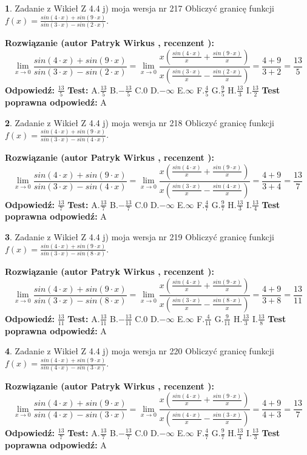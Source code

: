 \documentclass[12pt, a4paper]{article}
\theoremstyle{definition} %
\newtheorem{zad}{}
\newcommand{\zadStart}[1]{\begin{zad}#1\newline}
\newcommand{\zadStop}{\end{zad}}
\newcommand{\rozwStart}[2]{\noindent \textbf{Rozwiązanie (autor #1 , recenzent #2): }\newline}
\newcommand{\rozwStop}{\newline}
\newcommand{\odpStart}{\noindent \textbf{Odpowiedź:}\newline}
\newcommand{\odpStop}{\newline}
\newcommand{\testStart}{\noindent \textbf{Test:}\newline}
\newcommand{\testStop}{\newline}
\newcommand{\kluczStart}{\noindent \textbf{Test poprawna odpowiedź:}\newline}
\newcommand{\kluczStop}{\newline}
\begin{document}
\zadStart{Zadanie z Wikieł Z 4.4 j) moja wersja nr 217}
Obliczyć granicę funkcji $f(x)=\frac{sin(4\cdot x) +sin(9\cdot x)}{sin(3\cdot x) -sin(2\cdot x)}$.
\zadStop
\rozwStart{Patryk Wirkus}{}
$$\lim\limits_{x\to 0}\frac{sin(4\cdot x) +sin(9\cdot x)}{sin(3\cdot x) -sin(2\cdot x)}=\lim\limits_{x\to 0}\frac{x(\frac{sin(4\cdot x)}{x}+\frac{sin(9\cdot x)}{x})}{x(\frac{sin(3\cdot x)}{x}-\frac{sin(2\cdot x)}{x})}=\frac{4+9}{3+2} = \frac{13}{5}$$
\rozwStop
\odpStart
$\frac{13}{5}$
\odpStop
\testStart
A.$\frac{13}{5}$
B.$-\frac{13}{5}$
C.$0$
D.$-\infty$
E.$\infty$
F.$\frac{4}{5}$
G.$\frac{9}{5}$
H.$\frac{13}{3}$
I.$\frac{13}{2}$
\testStop
\kluczStart
A
\kluczStop



\zadStart{Zadanie z Wikieł Z 4.4 j) moja wersja nr 218}
Obliczyć granicę funkcji $f(x)=\frac{sin(4\cdot x) +sin(9\cdot x)}{sin(3\cdot x) -sin(4\cdot x)}$.
\zadStop
\rozwStart{Patryk Wirkus}{}
$$\lim\limits_{x\to 0}\frac{sin(4\cdot x) +sin(9\cdot x)}{sin(3\cdot x) -sin(4\cdot x)}=\lim\limits_{x\to 0}\frac{x(\frac{sin(4\cdot x)}{x}+\frac{sin(9\cdot x)}{x})}{x(\frac{sin(3\cdot x)}{x}-\frac{sin(4\cdot x)}{x})}=\frac{4+9}{3+4} = \frac{13}{7}$$
\rozwStop
\odpStart
$\frac{13}{7}$
\odpStop
\testStart
A.$\frac{13}{7}$
B.$-\frac{13}{7}$
C.$0$
D.$-\infty$
E.$\infty$
F.$\frac{4}{7}$
G.$\frac{9}{7}$
H.$\frac{13}{3}$
I.$\frac{13}{4}$
\testStop
\kluczStart
A
\kluczStop



\zadStart{Zadanie z Wikieł Z 4.4 j) moja wersja nr 219}
Obliczyć granicę funkcji $f(x)=\frac{sin(4\cdot x) +sin(9\cdot x)}{sin(3\cdot x) -sin(8\cdot x)}$.
\zadStop
\rozwStart{Patryk Wirkus}{}
$$\lim\limits_{x\to 0}\frac{sin(4\cdot x) +sin(9\cdot x)}{sin(3\cdot x) -sin(8\cdot x)}=\lim\limits_{x\to 0}\frac{x(\frac{sin(4\cdot x)}{x}+\frac{sin(9\cdot x)}{x})}{x(\frac{sin(3\cdot x)}{x}-\frac{sin(8\cdot x)}{x})}=\frac{4+9}{3+8} = \frac{13}{11}$$
\rozwStop
\odpStart
$\frac{13}{11}$
\odpStop
\testStart
A.$\frac{13}{11}$
B.$-\frac{13}{11}$
C.$0$
D.$-\infty$
E.$\infty$
F.$\frac{4}{11}$
G.$\frac{9}{11}$
H.$\frac{13}{3}$
I.$\frac{13}{8}$
\testStop
\kluczStart
A
\kluczStop



\zadStart{Zadanie z Wikieł Z 4.4 j) moja wersja nr 220}
Obliczyć granicę funkcji $f(x)=\frac{sin(4\cdot x) +sin(9\cdot x)}{sin(4\cdot x) -sin(3\cdot x)}$.
\zadStop
\rozwStart{Patryk Wirkus}{}
$$\lim\limits_{x\to 0}\frac{sin(4\cdot x) +sin(9\cdot x)}{sin(4\cdot x) -sin(3\cdot x)}=\lim\limits_{x\to 0}\frac{x(\frac{sin(4\cdot x)}{x}+\frac{sin(9\cdot x)}{x})}{x(\frac{sin(4\cdot x)}{x}-\frac{sin(3\cdot x)}{x})}=\frac{4+9}{4+3} = \frac{13}{7}$$
\rozwStop
\odpStart
$\frac{13}{7}$
\odpStop
\testStart
A.$\frac{13}{7}$
B.$-\frac{13}{7}$
C.$0$
D.$-\infty$
E.$\infty$
F.$\frac{4}{7}$
G.$\frac{9}{7}$
H.$\frac{13}{4}$
I.$\frac{13}{3}$
\testStop
\kluczStart
A
\kluczStop
\end{document}
